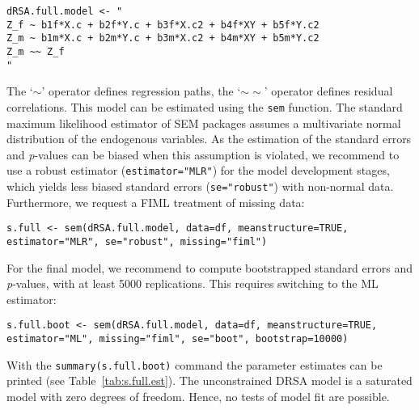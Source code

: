 \documentclass[jou,a4paper,draftfirst]{apa6}
\begin{document}
\begin{lstlisting}
dRSA.full.model <- "
Z_f ~ b1f*X.c + b2f*Y.c + b3f*X.c2 + b4f*XY + b5f*Y.c2
Z_m ~ b1m*X.c + b2m*Y.c + b3m*X.c2 + b4m*XY + b5m*Y.c2
Z_m ~~ Z_f
"
\end{lstlisting}

The `$\sim$' operator defines regression paths, the `$\sim\sim$' operator defines residual correlations. This model can be estimated using the \texttt{sem} function. The standard maximum likelihood estimator of SEM packages assumes a multivariate normal distribution of the endogenous variables. As the estimation of the standard errors and \textit{p}-values can be biased when this assumption is violated, we recommend to use a robust estimator (\texttt{estimator="MLR"}) for the model development stages, which yields less biased standard errors (\texttt{se="robust"}) with non-normal data. Furthermore, we request a FIML treatment of missing data:

\begin{lstlisting}
s.full <- sem(dRSA.full.model, data=df, meanstructure=TRUE, estimator="MLR", se="robust", missing="fiml")
\end{lstlisting}

For the final model, we recommend to compute bootstrapped standard errors and \textit{p}-values, with at least 5000 replications. This requires switching to the ML estimator:

\begin{lstlisting}
s.full.boot <- sem(dRSA.full.model, data=df, meanstructure=TRUE, estimator="ML", missing="fiml", se="boot", bootstrap=10000)
\end{lstlisting}

With the \texttt{summary(s.full.boot)} command the parameter estimates can be printed (see Table~\ref{tab:s.full.est}). The unconstrained DRSA model is a saturated model with zero degrees of freedom. Hence, no tests of model fit are possible.
\end{document}
